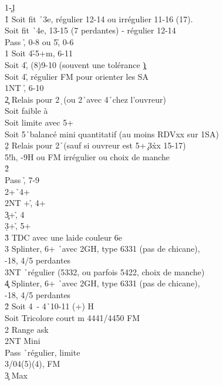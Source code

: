 \documentclass[a4paper]{article}
\begin{document}
\begin{bidtable}
1\c-1\d\+\\
1\h \> Soit fit \h\ 3e, régulier 12-14 ou irrégulier 11-16 (17).\\
\>Soit fit \h\ 4e, 13-15 (7 perdantes) - régulier 12-14\+\\
Pass \h , 0-8 ou 5\h , 0-6\\
1\s \> Soit 4\h -5+m, 6-11\\
\>Soit 4\h , (8)9-10 (souvent une tolérance \c )\\
\>Soit 4\h , régulier FM pour orienter les SA\\
1NT \h , 6-10\\
2\c \> Relais pour 2\d\ (ou 2\h\ avec 4\h\ chez l'ouvreur)\\
\>Soit faible à \d \\
\>Soit limite avec 5+\h \\
\>Soit 5\h\ balancé mini quantitatif (au moins RDVxx sur 1SA)\\
2\d \> Relais pour 2\h\ (sauf si ouvreur est 5+\c\ 3\h xx 15-17)\+\\
5!h, -9H ou FM irrégulier ou choix de manche\\
2\h\+\\
Pass \h , 7-9\\
2\s {}+\h\ 4+\s \\
2NT +\h , 4+\c \\
3\c {}+\h , 4\d \\
3\d {}+\h , 5+\d \\
3\h \> TDC avec une laide couleur 6e\\
3\s \> Splinter, 6+ \h\ avec 2GH, type 6331 (pas de chicane),\\
-18, 4/5 perdantes              \\
3NT \h\ régulier (5332, ou parfois 5422, choix de manche)\\
4\c\d \> Splinter, 6+ \h\ avec 2GH, type 6331 (pas de chicane),\\
-18, 4/5 perdantes\-\-\\
2\h \> Soit 4\s\ - 4\h\ 10-11 (+) H\\
\>Soit Tricolore court m 4441/4450 FM \\
2\s \> Range ask\+\\
2NT \> Mini\+\\
Pass \h\ régulier, limite\\
3\s {}/04(5)(4), FM\-\\
3\c \> Max\+\\

\end{bidtable}
\end{document}
